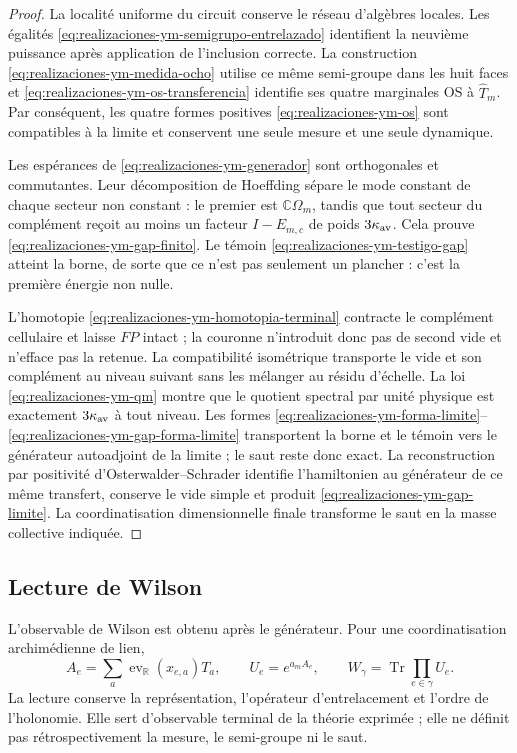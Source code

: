 \begin{proof}
La localité uniforme du circuit conserve le réseau d’algèbres locales. Les
égalités \eqref{eq:realizaciones-ym-semigrupo-entrelazado} identifient la
neuvième puissance après application de l’inclusion correcte. La construction
\eqref{eq:realizaciones-ym-medida-ocho} utilise ce même semi-groupe dans les huit
faces et \eqref{eq:realizaciones-ym-os-transferencia} identifie ses quatre
marginales OS à \(\widehat T_m\). Par conséquent, les quatre formes positives
\eqref{eq:realizaciones-ym-os} sont compatibles à la limite et conservent une
seule mesure et une seule dynamique.

Les espérances de \eqref{eq:realizaciones-ym-generador} sont orthogonales et
commutantes. Leur décomposition de Hoeffding sépare le mode constant de chaque
secteur non constant : le premier est \(\mathbb C\Omega_m\), tandis que tout
secteur du complément reçoit au moins un facteur \(I-E_{m,c}\) de poids
\(3\kappa_{\rm av}\). Cela prouve
\eqref{eq:realizaciones-ym-gap-finito}. Le témoin
\eqref{eq:realizaciones-ym-testigo-gap} atteint la borne, de sorte que ce n’est pas
seulement un plancher : c’est la première énergie non nulle.

L'homotopie \eqref{eq:realizaciones-ym-homotopia-terminal} contracte le complément cellulaire et laisse \(FP\) intact ; la couronne n'introduit donc pas de second vide et n'efface pas la retenue. La compatibilité isométrique transporte le vide et son complément au niveau suivant sans les mélanger au résidu d'échelle. La loi \eqref{eq:realizaciones-ym-qm} montre que le quotient spectral par unité physique est exactement \(3\kappa_{\rm av}\) à tout niveau. Les formes \eqref{eq:realizaciones-ym-forma-limite}--\eqref{eq:realizaciones-ym-gap-forma-limite} transportent la borne et le témoin vers le générateur autoadjoint de la limite ; le saut reste donc exact. La reconstruction par positivité d'Osterwalder--Schrader identifie l'hamiltonien au générateur de ce même transfert, conserve le vide simple et produit \eqref{eq:realizaciones-ym-gap-limite}. La coordinatisation dimensionnelle finale transforme le saut en la masse collective indiquée.
\end{proof}



\subsection*{Lecture de Wilson}

L'observable de Wilson est obtenu après le générateur. Pour une coordinatisation archimédienne de lien,
\begin{equation}\label{eq:realizaciones-ym-wilson}
 A_e=\sum_a\operatorname{ev}_{\mathbb R}(x_{e,a})T_a,
 \qquad
 U_e=e^{a_mA_e},
 \qquad
 W_\gamma=\operatorname{Tr}\!\prod_{e\in\gamma}U_e.
\end{equation}
La lecture conserve la représentation, l'opérateur d'entrelacement et l'ordre de l'holonomie. Elle sert d'observable terminal de la théorie exprimée ; elle ne définit pas rétrospectivement la mesure, le semi-groupe ni le saut.

